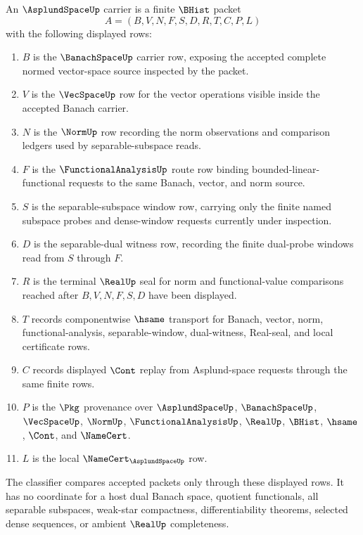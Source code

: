 \begin{definition}
\label{def:asplund-space-carrier}
An $\AsplundSpaceUp$ carrier is a finite $\BHist$ packet
$$
A=(B,V,N,F,S,D,R,T,C,P,L)
$$
with the following displayed rows:
\begin{enumerate}
\item $B$ is the $\BanachSpaceUp$ carrier row, exposing the accepted complete normed vector-space source inspected by the packet.
\item $V$ is the $\VecSpaceUp$ row for the vector operations visible inside the accepted Banach carrier.
\item $N$ is the $\NormUp$ row recording the norm observations and comparison ledgers used by separable-subspace reads.
\item $F$ is the $\FunctionalAnalysisUp$ route row binding bounded-linear-functional requests to the same Banach, vector, and norm source.
\item $S$ is the separable-subspace window row, carrying only the finite named subspace probes and dense-window requests currently under inspection.
\item $D$ is the separable-dual witness row, recording the finite dual-probe windows read from $S$ through $F$.
\item $R$ is the terminal $\RealUp$ seal for norm and functional-value comparisons reached after $B,V,N,F,S,D$ have been displayed.
\item $T$ records componentwise $\hsame$ transport for Banach, vector, norm, functional-analysis, separable-window, dual-witness, Real-seal, and local certificate rows.
\item $C$ records displayed $\Cont$ replay from Asplund-space requests through the same finite rows.
\item $P$ is the $\Pkg$ provenance over $\AsplundSpaceUp$, $\BanachSpaceUp$, $\VecSpaceUp$, $\NormUp$, $\FunctionalAnalysisUp$, $\RealUp$, $\BHist$, $\hsame$, $\Cont$, and $\NameCert$.
\item $L$ is the local $\NameCert_{\AsplundSpaceUp}$ row.
\end{enumerate}
The classifier compares accepted packets only through these displayed rows. It has no coordinate for a host dual Banach space, quotient functionals, all separable subspaces, weak-star compactness, differentiability theorems, selected dense sequences, or ambient $\RealUp$ completeness.
\end{definition}

